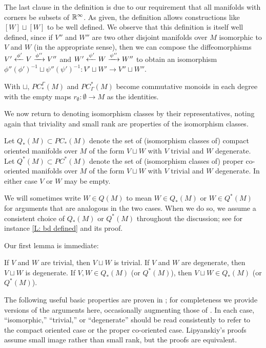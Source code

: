 The last clause in the definition is due to our requirement that all manifolds with corners be subsets of $\mathbb{R}^\infty$.
As given, the definition allows constructions like $[W]\sqcup[W]$ to be well defined.
We observe that this definition is itself well defined, since if $V''$ and $W''$ are two other disjoint manifolds over $M$ isomorphic to $V$ and $W$ (in the appropriate sense), then we can compose the diffeomorphisms $V'\xleftarrow{\phi'}V \xrightarrow{\phi''} V''$ and $W'\xleftarrow{\psi'}W \xrightarrow{\psi''} W''$ to obtain an isomorphism $\phi''(\phi')^{-1} \sqcup \psi''(\psi')^{-1} \colon V' \sqcup W' \to V'' \sqcup W''$.

With $\sqcup$, $PC^\Gamma_*(M)$ and $PC_\Gamma^*(M)$ become commutative monoids in each degree with the empty maps $r_\emptyset \colon \emptyset \to M$ as the identities.

We now return to denoting isomorphism classes by their representatives, noting again that triviality and small rank are properties of the isomorphism classes.

\begin{definition}
	Let $Q_*(M) \subset PC_*(M)$ denote the set of (isomorphism classes of) compact oriented manifolds over $M$ of the form $V \sqcup W$ with $V$ trivial and $W$ degenerate.
	Let $Q^*(M) \subset PC^*(M)$ denote the set of (isomorphism classes of) proper co-oriented manifolds over $M$ of the form $V \sqcup W$ with $V$ trivial and $W$ degenerate.
	In either case $V$ or $W$ may be empty.

	We will sometimes write $W \in Q(M)$ to mean $W \in Q_*(M)$ or $W \in Q^*(M)$ for arguments that are analogous in the two cases.
	When we do so, we assume a consistent choice of $Q_*(M)$ or $Q^*(M)$ throughout the discussion; see for instance \cref{L: bd defined} and its proof.
\end{definition}

Our first lemma is immediate:

\begin{lemma}\label{L: sum of trivial/degenerate}
If $V$ and $W$ are trivial, then $V \sqcup W$ is trivial. 
If $V$ and $W$ are degenerate, then $V \sqcup W$ is degenerate.
If $V,W\in Q_*(M)$ (or $Q^*(M)$), then $V \sqcup W \in Q_*(M)$ (or $Q^*(M)$). 
\end{lemma}

The following useful basic properties are proven in \cite{Lipy14}; for completeness we provide versions of the arguments here, occasionally augmenting those of \cite{Lipy14}.
In each case, ``isomorphic,'' ``trivial,'' or ``degenerate'' should be read consistently to refer to the compact oriented case or the proper co-oriented case.
Lipyanskiy's proofs assume small image rather than small rank, but the proofs are equivalent.



